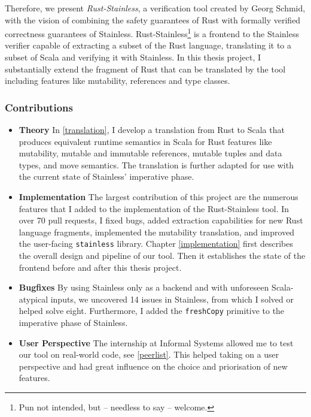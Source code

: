 Therefore, we present \emph{Rust-Stainless}, a verification tool created by
Georg Schmid, with the vision of combining the safety guarantees of Rust with
formally verified correctness guarantees of Stainless.
Rust-Stainless\footnote{Pun not intended, but -- needless to say -- welcome.} is
a frontend to the Stainless verifier capable of extracting a subset of the Rust
language, translating it to a subset of Scala and verifying it with Stainless.
In this thesis project, I substantially extend the fragment of Rust that can be
translated by the tool including features like mutability, references and type
classes.

\subsubsection{Contributions}

\begin{itemize}

\item \textbf{Theory} In \autoref{translation}, I develop a translation from
Rust to Scala that produces equivalent runtime semantics in Scala for Rust
features like mutability, mutable and immutable references, mutable tuples and
data types, and move semantics. The translation is further adapted for use with
the current state of Stainless' imperative phase.

\item \textbf{Implementation} The largest contribution of this project are the
numerous features that I added  to the implementation of the Rust-Stainless
tool. In over 70 pull requests, I fixed bugs, added extraction capabilities for
new Rust language fragments, implemented the mutability translation, and
improved the user-facing \lstinline!stainless! library. Chapter
\ref{implementation} first describes the overall design and pipeline of our
tool. Then it establishes the state of the frontend before and after this thesis
project.


\item \textbf{Bugfixes} By using Stainless only as a backend and with unforeseen
Scala-atypical inputs, we uncovered 14 issues in Stainless, from which I solved
or helped solve eight. Furthermore, I added the \lstinline!freshCopy! primitive
to the imperative phase of Stainless.

\item \textbf{User Perspective} The internship at Informal Systems allowed me to
test our tool on real-world code, see \autoref{peerlist}. This helped taking on
a user perspective and had great influence on the choice and priorisation of new
features.

\end{itemize}
